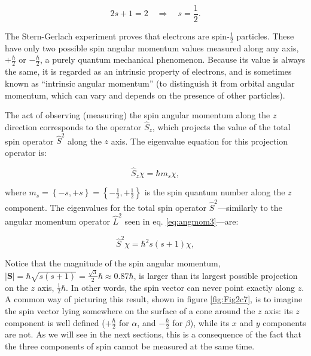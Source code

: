 \documentclass[
  english,
  9pt,
]{extbook}
\theoremstyle{definition}
\theoremstyle{definition}
\theoremstyle{definition}
\theoremstyle{definition}
\theoremstyle{remark}
\begin{document}
\begin{equation}
2s+1=2 \quad\Rightarrow\quad s=\frac{1}{2}.
\label{eq:spin0}
\end{equation}

The Stern-Gerlach experiment proves that electrons are spin-\(\frac{1}{2}\) particles. These have only two possible spin angular momentum values measured along any axis, \(+\frac {\hbar }{2}\) or \(-\frac {\hbar }{2}\), a purely quantum mechanical phenomenon. Because its value is always the same, it is regarded as an intrinsic property of electrons, and is sometimes known as ``intrinsic angular momentum'' (to distinguish it from orbital angular momentum, which can vary and depends on the presence of other particles).

The act of observing (measuring) the spin angular momentum along the \(z\) direction corresponds to the operator \(\hat{S}_z\), which projects the value of the total spin operator \(\hat{S}^2\) along the \(z\) axis. The eigenvalue equation for this projection operator is:

\begin{equation}
\hat{S}_z \chi = \hbar m_s \chi,
\label{eq:spin0b}
\end{equation}

where \(m_s=\left\{-s,+s\right\}=\left\{-\frac{1}{2},+\frac{1}{2}\right\}\) is the spin quantum number along the \(z\) component. The eigenvalues for the total spin operator \(\hat{S}^2\)---similarly to the angular momentum operator \(\hat{L}^2\) seen in eq. \eqref{eq:angmom3}---are:

\begin{equation}
\hat{S}^2 \chi = \hbar^2 s(s+1) \chi,
\label{eq:spin0c}
\end{equation}

Notice that the magnitude of the spin angular momentum, \(|\mathbf{S}|=\hbar\sqrt{s(s+1)}=\frac{\sqrt{3}}{2}\hbar\approx0.87\hbar\), is larger than its largest possible projection on the \(z\) axis, \(\frac{1}{2}\hbar\). In other words, the spin vector can never point exactly along \(z\). A common way of picturing this result, shown in figure \ref{fig:Fig2c7}, is to imagine the spin vector lying somewhere on the surface of a cone around the \(z\) axis: its \(z\) component is well defined (\(+\frac{\hbar}{2}\) for \(\alpha\), and \(-\frac{\hbar}{2}\) for \(\beta\)), while its \(x\) and \(y\) components are not. As we will see in the next sections, this is a consequence of the fact that the three components of spin cannot be measured at the same time.
\end{document}
